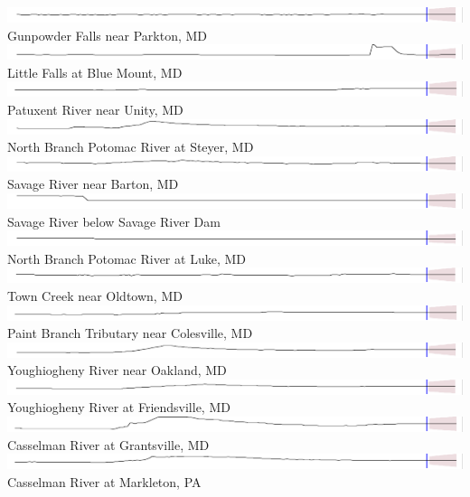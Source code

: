 \documentclass[10pt]{sugconf-ish}
\begin{document}
\includegraphics{fc01581920.pdf}Gunpowder Falls near Parkton, MD\\
\includegraphics{fc01582000.pdf}Little Falls at Blue Mount, MD\\
\includegraphics{fc01591000.pdf}Patuxent River near Unity, MD\\
\includegraphics{fc01595000.pdf}North Branch Potomac River at Steyer, MD\\
\includegraphics{fc01596500.pdf}Savage River near Barton, MD\\
\includegraphics{fc01597500.pdf}Savage River below Savage River Dam \\
\includegraphics{fc01598500.pdf}North Branch Potomac River at Luke, MD\\
\includegraphics{fc01609000.pdf}Town Creek near Oldtown, MD\\
\includegraphics{fc01649150.pdf}Paint Branch Tributary near Colesville, MD\\
\includegraphics{fc03075500.pdf}Youghiogheny River near Oakland, MD\\
\includegraphics{fc03076500.pdf}Youghiogheny River at Friendsville, MD\\
\includegraphics{fc03078000.pdf}Casselman River at Grantsville, MD\\
\includegraphics{fc03079000.pdf}Casselman River at Markleton, PA\\
\end{document}
